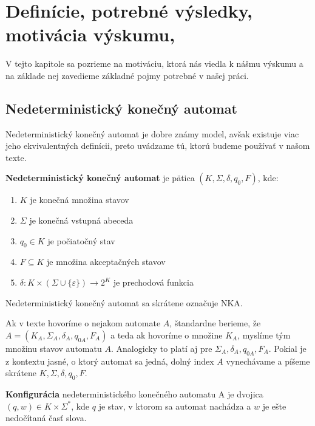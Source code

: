 \chapter{Definície, potrebné výsledky, motivácia výskumu, }
\label{kap:old} %

V tejto kapitole sa pozrieme na motiváciu, ktorá nás viedla k nášmu výskumu a na základe nej zavedieme základné pojmy potrebné v našej práci. 

\section{Nedeterministický konečný automat}
Nedeterministický konečný automat je dobre známy model, avšak existuje viac jeho ekvivalentných definícii, preto uvádzame tú, ktorú budeme používať v našom texte.
\\
\begin{definition}
\textbf{Nedeterministický konečný automat} je pätica $ (K, \Sigma, \delta, q_0, F) $, kde:
\begin{enumerate}  
\item $ K $ je konečná množina stavov
\item $ \Sigma $ je konečná vstupná abeceda
\item $ q_0 \in K $ je počiatočný stav
\item $ F \subseteq K $ je množina akceptačných stavov
\item $ \delta : K \times (\Sigma \cup \lbrace \varepsilon \rbrace) \rightarrow 2^{K} $ je prechodová funkcia
\end{enumerate}

\end{definition}

\begin{note}
Nedeterministický konečný automat sa skrátene označuje NKA.
\end{note}

\begin{note}
Ak v texte hovoríme o nejakom automate $ A $, štandardne berieme, že $ A=(K_A, \Sigma_A, \delta_A, q_{0A}, F_A) $ a teda ak hovoríme o množine $ K_A $, myslíme tým množinu stavov automatu $ A $. Analogicky to platí aj pre $  \Sigma_A, \delta_A, q_{0A}, F_A $. Pokial je z kontextu jasné, o ktorý automat sa jedná, dolný index $ A $ vynechávame a píšeme skrátene  $ K, \Sigma, \delta, q_0, F $.
\end{note}

\begin{definition}
\textbf{Konfigurácia} nedeterministického konečného automatu A je dvojica $ (q,w) \in K \times \Sigma^{*} $, kde $ q $ je stav, v ktorom sa automat nachádza a $ w $ je ešte nedočítaná časť slova.
\end{definition}

